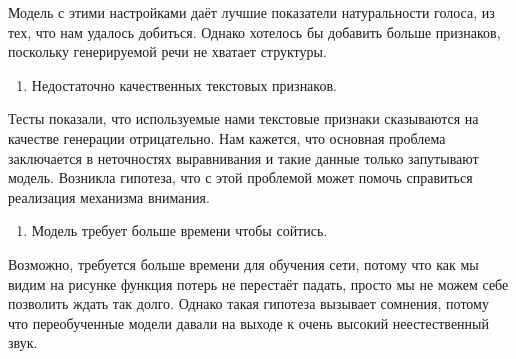 \documentclass[../diploma.tex]{subfiles}
\begin{document}
Модель с этими настройками даёт лучшие показатели натуральности голоса, из тех, что нам удалось добиться. Однако хотелось бы добавить больше признаков, поскольку генерируемой речи не хватает структуры.

\begin{enumerate}[resume]
    \item Недостаточно качественных текстовых признаков.
\end{enumerate}

Тесты показали, что используемые нами текстовые признаки сказываются на качестве генерации отрицательно. Нам кажется, что основная проблема заключается в неточностях выравнивания и такие данные только запутывают модель. Возникла гипотеза, что с этой проблемой может помочь справиться реализация механизма внимания.

\begin{enumerate}[resume]
    \item Модель требует больше времени чтобы сойтись.
\end{enumerate}
Возможно, требуется больше времени для обучения сети, потому что как мы видим на рисунке \label{fig:perf} функция потерь не перестаёт падать, просто мы не можем себе позволить ждать так долго.
Однако такая гипотеза вызывает сомнения, потому что переобученные модели давали на выходе к очень высокий неестественный звук.

\newpage
\end{document}
